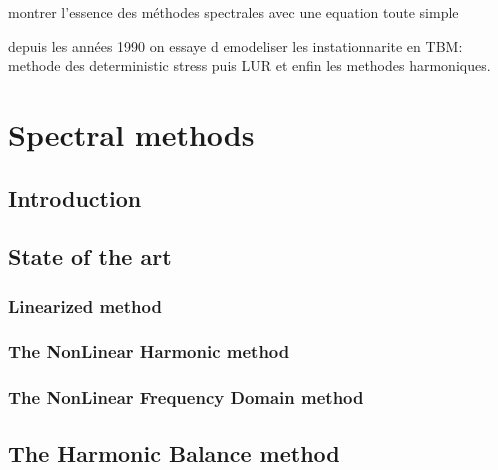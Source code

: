 
montrer l'essence des méthodes spectrales avec une equation toute simple

depuis les années 1990 on essaye d emodeliser les instationnarite en TBM:
methode des deterministic stress puis LUR et enfin les methodes harmoniques.

\chapter{Spectral methods}
\label{cha:spectral_methods}

\section{Introduction}
\label{sec:sm_introduction}


\section{State of the art}
\label{sec:sm_state_of_the_art}


\subsection{Linearized method}
\label{sub:sm_lur}


\subsection{The NonLinear Harmonic method}
\label{sub:sm_nlh}


\subsection{The NonLinear Frequency Domain method}
\label{sub:sm_nlfd}


\section{The Harmonic Balance method}
\label{sec:sm_hb}


